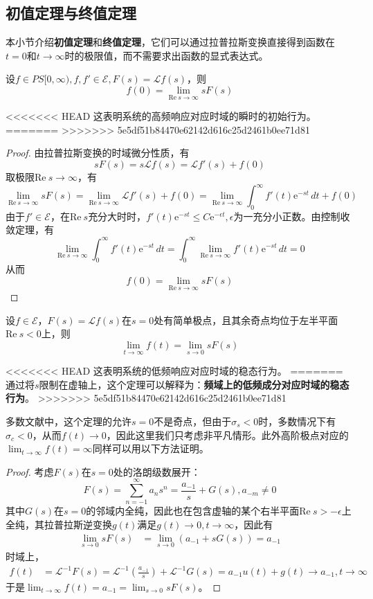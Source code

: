 \subsection{初值定理与终值定理}\label{sub:initial_and_final_value}
本小节介绍\textbf{初值定理}和\textbf{终值定理}，它们可以通过拉普拉斯变换直接得到函数在$t=0$和$t\to\infty$时的极限值，而不需要求出函数的显式表达式。
\begin{theorem}[初值定理]
    设$f\in PS[0,\infty),f,f'\in\mathcal{E},F(s)=\mathcal{L} f(s)$，则
    \[f(0)=\lim_{\text{Re}\ s\to\infty}sF(s)\]
\end{theorem}
<<<<<<< HEAD
这表明系统的高频响应对应时域的瞬时的初始行为。
=======
>>>>>>> 5e5df51b84470e62142d616c25d2461b0ee71d81
\begin{proof}
    由拉普拉斯变换的时域微分性质，有
    \[sF(s)=s\mathcal{L} f(s)=\mathcal{L} f'(s)+f(0)\]
    取极限$\text{Re}\ s\to\infty$，有
    \[\lim_{\text{Re}\ s\to\infty}sF(s)=\lim_{\text{Re}\ s\to\infty}\mathcal{L} f'(s)+f(0)=\lim_{\text{Re}\ s\to\infty}\int_{0}^{\infty}f'(t)\mathrm{e}^{-st}\,dt+f(0)\]
    由于$f'\in\mathcal{E} $，在$\text{Re}\ s$充分大时时，$f'(t)\mathrm{e}^{-st}\leq C \mathrm{e}^{-\epsilon t},\epsilon$为一充分小正数。由控制收敛定理，有
    \[\lim_{\text{Re}\ s\to\infty}\int_{0}^{\infty}f'(t)\mathrm{e}^{-st}\,dt=\int_{0}^{\infty}\lim_{\text{Re}\ s\to\infty}f'(t)\mathrm{e}^{-st}\,dt=0\]
    从而\[f(0)=\lim_{\text{Re}\ s\to\infty}sF(s)\]
\end{proof}

\begin{theorem}[终值定理]
    设$f\in\mathcal{E} $，$F(s)=\mathcal{L} f(s)$在$s=0$处有简单极点，且其余奇点均位于左半平面$\text{Re}\ s<0$上，则
    \[\lim_{t\to\infty}f(t)=\lim_{s\to 0}sF(s)\]
\end{theorem}
<<<<<<< HEAD
这表明系统的低频响应对应时域的稳态行为。
=======
通过将$s$限制在虚轴上，这个定理可以解释为：\textbf{频域上的低频成分对应时域的稳态行为}。
>>>>>>> 5e5df51b84470e62142d616c25d2461b0ee71d81
\begin{remark}
多数文献中，这个定理的允许$s=0$不是奇点，但由于$\sigma_s<0$时，多数情况下有$\sigma_c<0$，从而$f(t)\to 0$，因此这里我们只考虑非平凡情形。此外高阶极点对应的$\lim_{t\to\infty}f(t)=\infty$同样可以用以下方法证明。
\end{remark}
\begin{proof}
    考虑$F(s)$在$s=0$处的洛朗级数展开：
    \[F(s)=\sum_{n=-1}^{\infty}a_n s^n=\frac{a_{-1}}{s}+G(s),a_{-m}\neq 0\]
    其中$G(s)$在$s=0$的邻域内全纯，因此也在包含虚轴的某个右半平面$\text{Re}\ s>-\epsilon$上全纯，其拉普拉斯逆变换$g(t)$满足$g(t)\to 0,t\to\infty$，因此有\begin{align*}
        \lim_{s\to 0}sF(s)&=\lim_{s\to 0}\left(a_{-1}+sG(s)\right)=a_{-1}
    \end{align*}
    时域上，\begin{align*}
        f(t)&=\mathcal{L}^{-1} F(s)=\mathcal{L}^{-1}\left(\frac{a_{-1}}{s}\right)+\mathcal{L}^{-1} G(s)=a_{-1}u(t)+g(t)\to a_{-1},t\to\infty
    \end{align*}
    于是$\lim_{t\to\infty}f(t)=a_{-1}=\lim_{s\to 0}sF(s)$。
\end{proof}


